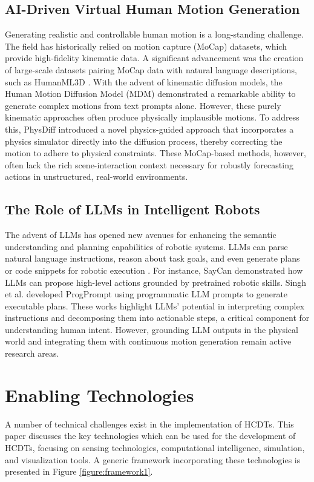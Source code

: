 \subsection{AI-Driven Virtual Human Motion Generation}
Generating realistic and controllable human motion is a long-standing challenge. The field has historically relied on motion capture (MoCap) datasets, which provide high-fidelity kinematic data. A significant advancement was the creation of large-scale datasets pairing MoCap data with natural language descriptions, such as HumanML3D \cite{Guo_2022_CVPR}. With the advent of kinematic diffusion models, the Human Motion Diffusion Model (MDM) \cite{tevet2023human} demonstrated a remarkable ability to generate complex motions from text prompts alone. However, these purely kinematic approaches often produce physically implausible motions. To address this, PhysDiff \cite{Yuan2023} introduced a novel physics-guided approach that incorporates a physics simulator directly into the diffusion process, thereby correcting the motion to adhere to physical constraints. These MoCap-based methods, however, often lack the rich scene-interaction context necessary for robustly forecasting actions in unstructured, real-world environments.

\subsection{The Role of LLMs in Intelligent Robots}
The advent of LLMs has opened new avenues for enhancing the semantic understanding and planning capabilities of robotic systems. LLMs can parse natural language instructions, reason about task goals, and even generate plans or code snippets for robotic execution \cite{Fan2024, Singh2023}. For instance, SayCan \cite{Ahn2022} demonstrated how LLMs can propose high-level actions grounded by pretrained robotic skills. Singh et al. \cite{Singh2023} developed ProgPrompt using programmatic LLM prompts to generate executable plans. These works highlight LLMs' potential in interpreting complex instructions and decomposing them into actionable steps, a critical component for understanding human intent. However, grounding LLM outputs in the physical world and integrating them with continuous motion generation remain active research areas.

\section{Enabling Technologies}
A number of technical challenges exist in the implementation of HCDTs. This paper discusses the key technologies which can be used for the development of HCDTs, focusing on sensing technologies, computational intelligence, simulation, and visualization tools. A generic framework incorporating these technologies is presented in Figure \ref{figure:framework1}.

